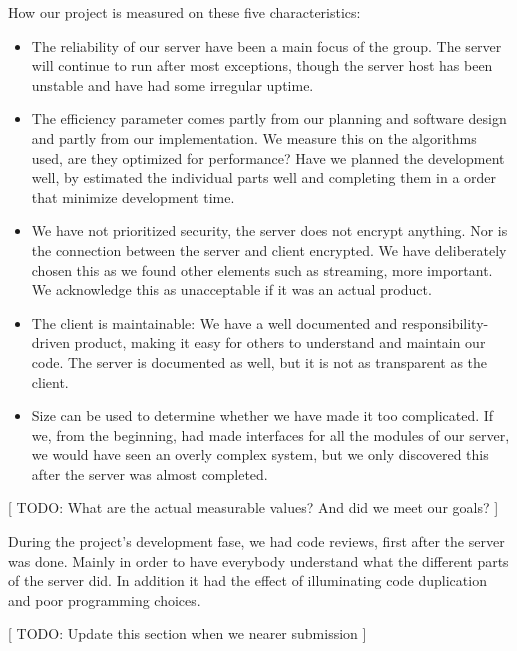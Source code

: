 How our project is measured on these five characteristics:
\begin{itemize}
 	\item The reliability of our server have been a main focus of the group. The server will continue to run after most exceptions, though the server host has been unstable and have had some irregular uptime.
 	\item The efficiency parameter comes partly from our planning and software design and partly from our implementation. We measure this on the algorithms used, are they optimized for performance? Have we planned the development well, by estimated the individual parts well and completing them in a order that minimize development time.
 	\item We have not prioritized security, the server does not encrypt anything. Nor is the connection between the server and client encrypted. We have deliberately chosen this as we found other elements such as streaming, more important. We acknowledge this as unacceptable if it was an actual product.  
 	\item The client is maintainable: We have a well documented and responsibility-driven product, making it easy for others to understand and maintain our code. The server is documented as well, but it is not as transparent as the client.
	\item Size can be used to determine whether we have made it too complicated. If we, from the beginning, had made interfaces for all the modules of our server, we would have seen an overly complex system, but we only discovered this after the server was almost completed. 
\end{itemize}

[ TODO: What are the actual measurable values? And did we meet our goals? ]

During the project's development fase, we had code reviews, first after the server was done. Mainly in order to have everybody understand what the different parts of the server did. In addition it had the effect of illuminating code duplication and poor programming choices.

[ TODO: Update this section when we nearer submission ]